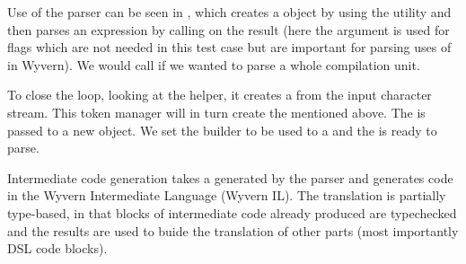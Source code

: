 \documentclass{article}
\begin{document}
\begin{mdP}[class={indent},data-line={166}]%
{}Use of the parser can be seen in
{}%
{}, which
creates a %
{}%
{} object by using the %
{}%
{}
utility and then parses an expression by calling %
{}%
{}
on the result (here the %
{}%
{} argument is used for flags which are
not needed in this test case but are important for parsing uses of
{}%
{} in Wyvern).  We would call %
{}%
{} if we wanted to
parse a whole compilation unit.%
\end{mdP}%
\begin{mdP}[class={indent},data-line={175}]%
{}To close the loop, looking at the %
{}%
{} helper, it creates a
{}%
{} from the input character stream.  This token
manager will in turn create the %
{}%
{} mentioned above.  The
{}%
{} is passed to a new %
{}%
{} object.  We
set the builder to be used to a %
{}%
{} and the
{}%
{} is ready to parse.%
\end{mdP}%
\begin{mdP}[data-line={186}]%
{}Intermediate code generation takes a %
{}%
{} generated by the
parser and generates code in the Wyvern Intermediate Language
(Wyvern IL).  The translation is partially type-based, in that
blocks of intermediate code already produced are typechecked and
the results are used to buide the translation of other parts
(most importantly DSL code blocks).%
\end{mdP}%
\end{document}
